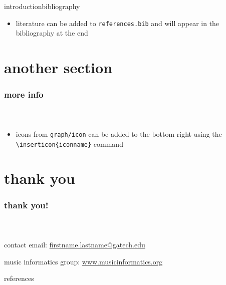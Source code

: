 \documentclass[aspectratio=169,t]{beamer}
\begin{document}
         \begin{frame}{introduction}{bibliography}
            \begin{itemize}
                \item   literature can be added to \texttt{references.bib} and will appear in the bibliography at the end \cite{lerch_introduction_2023}
            \end{itemize}
        \end{frame}
        
    \section[section]{another section}
        \begin{frame}\frametitle{more info}\framesubtitle{~}
            \begin{itemize}
                \item icons from \texttt{graph/icon} can be added to the bottom right using the \texttt{\textbackslash inserticon\{iconname\}} command
            \end{itemize}
        \end{frame}
        
    \section[contact]{thank you}
        \begin{frame}\frametitle{thank you!}\framesubtitle{~}
             \bigskip
              \begin{block}{contact}
                  email: \href{mailto:firstname.lastname@gatech.edu}{firstname.lastname@gatech.edu}
                  
                  \bigskip
                  music informatics group: 
                  \href{http://www.musicinformatics.org}{www.musicinformatics.org}
              \end{block}
          \end{frame}
      
    \begin{frame}[allowframebreaks]{references}{~}
        \tiny
        \printbibliography[title={references}]
    \end{frame}
\end{document}
